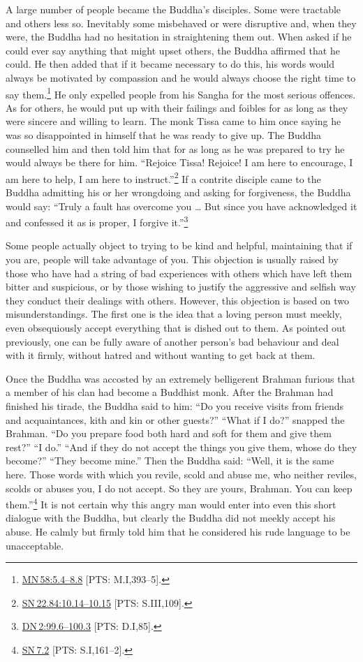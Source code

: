 \documentclass[10pt, openright]{book}
\begin{document}
A large number of people became the Buddha’s disciples. Some were tractable and others less so. Inevitably some misbehaved or were disruptive and, when they were, the Buddha had no hesitation in straightening them out. When asked if he could ever say anything that might upset others, the Buddha affirmed that he could. He then added that if it became necessary to do this, his words would always be motivated by compassion and he would always choose the right time to say them.\footnote {\href{https://suttacentral.net/mn58/en/sujato\#5.4}{MN 58:5.4–8.8} [PTS: M.I,393–5].} He only expelled people from his Sangha for the most serious offences. As for others, he would put up with their failings and foibles for as long as they were sincere and willing to learn. The monk Tissa came to him once saying he was so disappointed in himself that he was ready to give up. The Buddha counselled him and then told him that for as long as he was prepared to try he would always be there for him. “Rejoice Tissa! Rejoice! I am here to encourage, I am here to help, I am here to instruct.”\footnote {\href{https://suttacentral.net/sn22.84/en/sujato\#10.14}{SN 22.84:10.14–10.15} [PTS: S.III,109].} If a contrite disciple came to the Buddha admitting his or her wrongdoing and asking for forgiveness, the Buddha would say: “Truly a fault has overcome you … But since you have acknowledged it and confessed it as is proper, I forgive it.”\footnote {\href{https://suttacentral.net/dn2/en/sujato\#99.6}{DN 2:99.6–100.3} [PTS: D.I,85].}


Some people actually object to trying to be kind and helpful, maintaining that if you are, people will take advantage of you. This objection is usually raised by those who have had a string of bad experiences with others which have left them bitter and suspicious, or by those wishing to justify the aggressive and selfish way they conduct their dealings with others. However, this objection is based on two misunderstandings. The first one is the idea that a loving person must meekly, even obsequiously accept everything that is dished out to them. As pointed out previously, one can be fully aware of another person’s bad behaviour and deal with it firmly, without hatred and without wanting to get back at them.


Once the Buddha was accosted by an extremely belligerent Brahman furious that a member of his clan had become a Buddhist monk. After the Brahman had finished his tirade, the Buddha said to him: “Do you receive visits from friends and acquaintances, kith and kin or other guests?” “What if I do?” snapped the Brahman. “Do you prepare food both hard and soft for them and give them rest?” “I do.” “And if they do not accept the things you give them, whose do they become?” “They become mine.” Then the Buddha said: “Well, it is the same here. Those words with which you revile, scold and abuse me, who neither reviles, scolds or abuses you, I do not accept. So they are yours, Brahman. You can keep them.”\footnote {\href{https://suttacentral.net/sn7.2/en/sujato}{SN 7.2} [PTS: S.I,161–2].} It is not certain why this angry man would enter into even this short dialogue with the Buddha, but clearly the Buddha did not meekly accept his abuse. He calmly but firmly told him that he considered his rude language to be unacceptable.
\end{document}
